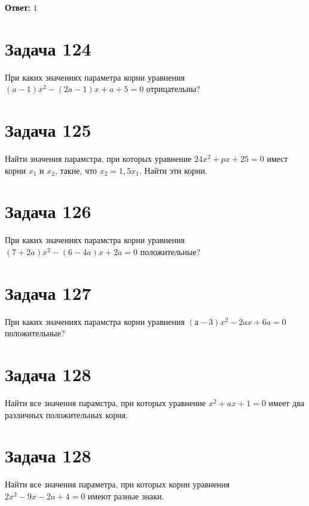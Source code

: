 \documentclass[a4paper,12pt]{article}
\begin{document}
\bigskip

\textbf{Ответ:} \(1\)

\section{Задача 124}

При каких значениях параметра корни уравнения
$(a - 1)x^2 - (2a - 1)x + a + 5 = 0$ отрицательны?

\section{Задача 125}

Найти значения парамстра, при которых уравнение
$24x^2 + px + 25 = 0$ имест корни $x_1$ и $x_2$, такие, что $x_2 = 1,5x_1$.
Найти эти корни.

\section{Задача 126}

При каких значениях парамстра корни уравнения
$(7 + 2a)x^2 - (6 - 4a)x + 2a = 0$ положительные?

\section{Задача 127}

При каких значениях парамстра корни уравнения
$(а - 3)x^2 - 2ax + 6a = 0$ положительные?

\section{Задача 128}

Найти все значения парамстра, при которых уравнение
$x^2 + ax + 1 = 0$ имеет два различных положительных корня.

\section{Задача 128}

Найти все значения параметра, при которых корни уравнения
$2x^2 - 9x - 2a + 4 = 0$ имеют разные знаки.
\end{document}
